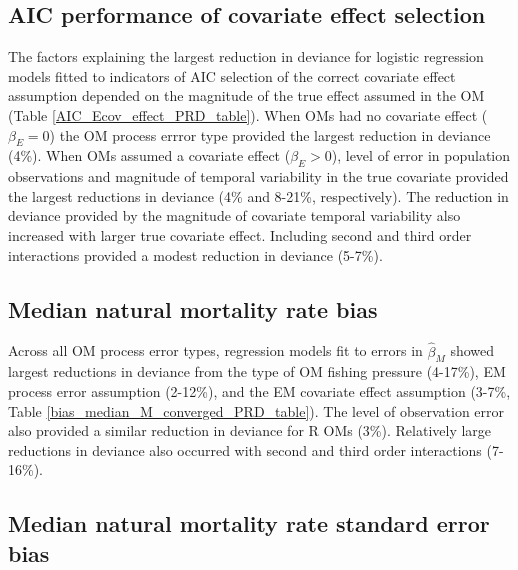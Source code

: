 \documentclass[
  12pt,
]{article}
\begin{document}
\subsection*{AIC performance of covariate effect
selection}\label{aic-performance-of-covariate-effect-selection}

The factors explaining the largest reduction in deviance for logistic
regression models fitted to indicators of AIC selection of the correct
covariate effect assumption depended on the magnitude of the true effect
assumed in the OM (Table \ref{AIC_Ecov_effect_PRD_table}). When OMs had
no covariate effect (\(\beta_E = 0\)) the OM process errror type
provided the largest reduction in deviance (4\%). When OMs assumed a
covariate effect (\(\beta_E>0\)), level of error in population
observations and magnitude of temporal variability in the true covariate
provided the largest reductions in deviance (4\% and 8-21\%,
respectively). The reduction in deviance provided by the magnitude of
covariate temporal variability also increased with larger true covariate
effect. Including second and third order interactions provided a modest
reduction in deviance (5-7\%).

\subsection*{Median natural mortality rate
bias}\label{median-natural-mortality-rate-bias}

Across all OM process error types, regression models fit to errors in
\(\widehat \beta_M\) showed largest reductions in deviance from the type
of OM fishing pressure (4-17\%), EM process error assumption (2-12\%),
and the EM covariate effect assumption (3-7\%, Table
\ref{bias_median_M_converged_PRD_table}). The level of observation error
also provided a similar reduction in deviance for R OMs (3\%).
Relatively large reductions in deviance also occurred with second and
third order interactions (7-16\%).

\subsection*{Median natural mortality rate standard error
bias}\label{median-natural-mortality-rate-standard-error-bias}
\end{document}

